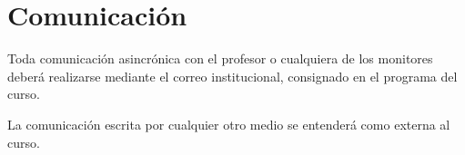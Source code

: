 \section{Comunicación}
Toda comunicación asincrónica con el profesor o cualquiera de los monitores deberá realizarse mediante el correo institucional, consignado en el programa del curso.

La comunicación escrita por cualquier otro medio se entenderá como externa al curso.

